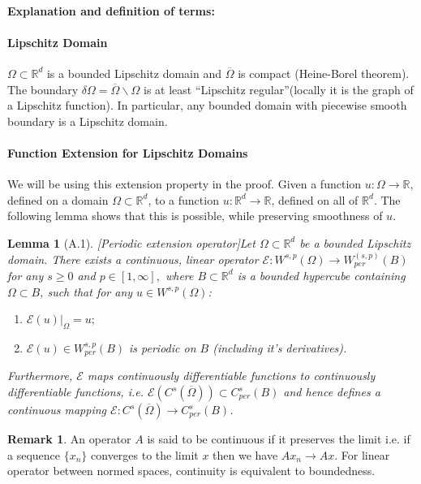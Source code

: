 \documentclass[reqno,9pt]{amsart}
\theoremstyle{plain}
\newtheorem{lem}{Lemma}
\theoremstyle{definition}
\newtheorem{rem}{Remark}
\newcommand{\bb}[1]{\mathbb{#1}}
\newcommand{\cal}[1]{\mathcal{#1}}
\begin{document}
\paragraph{\bf Explanation and definition of terms:}
\paragraph{\bf Lipschitz Domain}
$\Omega \subset \bb R^d$ is a bounded Lipschitz domain and $\overline{\Omega}$ is compact (Heine-Borel theorem). The boundary $\delta\Omega = \overline{\Omega}\backslash\Omega$ is at least ``Lipschitz regular''(locally it is the graph of a Lipschitz function). In particular, any bounded domain with piecewise smooth boundary is a Lipschitz domain.

\paragraph{\bf Function Extension for Lipschitz Domains}
We will be using this extension property in the proof. Given a function $u : \Omega \to \bb R$, defined on a domain $\Omega \subset \bb R^d$, to a function $u :\bb R^d \to \bb R$, defined on all of $\bb R^d$. The following lemma shows that this is possible, while preserving smoothness of $u$.
\begin{lem}[A.1][Periodic extension operator]\label{A.1}
    Let $\Omega \subset \bb R^d$ be a bounded Lipschitz domain. There exists a continuous, linear operator $\cal E : W^{s,p}(\Omega) \to W_{per}^{(s,p)}(B)$ for any $s \geq 0$ and $p \in [1,\infty],$ where $B \subset \bb R^d$ is a bounded hypercube containing $\Omega \subset B$, such that for any $u \in W^{s,p}(\Omega)$:
    \begin{enumerate}
        \item $\cal E(u)|_\Omega = u;$
        \item $\cal E(u) \in W^{s,p}_{per}(B)$ is periodic on $B$ (including it's derivatives).
    \end{enumerate}
    Furthermore, $\cal E$ maps continuously differentiable functions to continuously differentiable functions, i.e. $\cal E(C^s(\overline{\Omega})) \subset C^s_{per}(B)$ and hence defines a continuous mapping $\cal E: C^s(\overline{\Omega}) \to C^s_{per}(B)$.
\end{lem}
\begin{rem}
    An operator $A$ is said to be continuous if it preserves the limit i.e. if a sequence $\{x_n\}$ converges to the limit $x$ then we have $Ax_n \to Ax$. For linear operator between normed spaces, continuity is equivalent to boundedness.
\end{rem}
\end{document}
